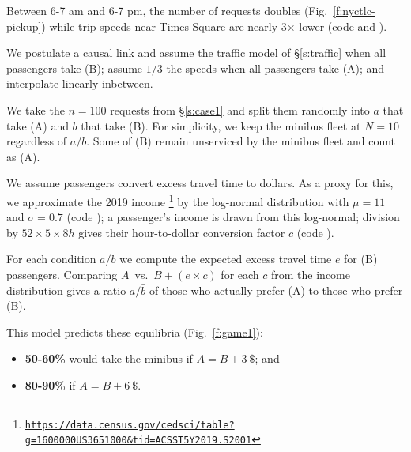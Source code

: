 \documentclass[12pt,notitlepage]{article}
\begin{document}
%

Between 6-7 am and 6-7 pm,
the number of requests doubles (Fig.~\ref{f:nyctlc-pickup})
while trip speeds near Times Square are nearly 3$\times$ lower
(code \codereref{\codetriptime} and ).
%

%
%
We postulate a causal link and
assume the traffic model of \S\ref{s:traffic} 
when all passengers take (B);
assume $1/3$ the speeds 
when all passengers take (A);
and
interpolate linearly inbetween.

%

We take the $n = 100$ requests from \S\ref{s:case1}
and split them randomly into $a$ that take (A) and $b$ that take (B).
%
%
For simplicity,
we keep the minibus fleet at $N = 10$ regardless of $a/b$.
%
Some of (B) remain unserviced by the minibus fleet and count as (A).

%

We assume
passengers convert excess travel time to dollars.
%
As a proxy for this, 
we approximate the 2019 income%
\footnote{\href{https://data.census.gov/cedsci/table?g=1600000US3651000&tid=ACSST5Y2019.S2001&hidePreview=true&moe=false}{\color{gray} \texttt{https://data.census.gov/cedsci/table?g=1600000US3651000\&tid=ACSST5Y2019.S2001}}}
by
the log-normal distribution with $\mu = 11$ and $\sigma = 0.7$
(code );
%
a passenger's income is drawn from this log-normal;
%
division by $52 \times 5 \times 8 \si{h}$ gives their hour-to-dollar conversion factor $c$ (code ).

%

For each condition $a / b$
we compute the expected excess travel time $e$ 
for (B) passengers.
%
%
%
Comparing
$A$~vs.~$B + (e \times c)$
for each $c$ from the income distribution
gives a ratio $\bar{a} / \bar{b}$
of those who actually prefer (A) to those who prefer (B).
%
%

%

This model predicts these equilibria (Fig.~\ref{f:game1}):
\begin{itemize}
\item 
	\textbf{50-60\%} would take the minibus if $A = B + \SI{3}{\$}$; and
\item
	\textbf{80-90\%} if $A = B + \SI{6}{\$}$.
\end{itemize}
\end{document}
